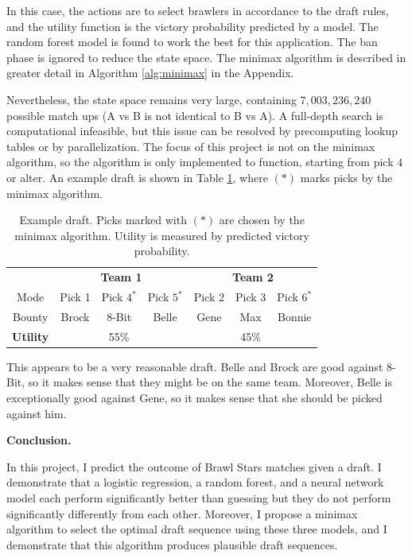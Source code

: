 \documentclass[11pt]{article}
\begin{document}
In this case, the actions are to select brawlers in accordance to the draft rules, and the utility function is the victory probability predicted by a model. The random forest model is found to work the best for this application. The ban phase is ignored to reduce the state space. The minimax algorithm is described in greater detail in Algorithm \ref{alg:minimax} in the Appendix.

Nevertheless, the state space remains very large, containing $7,003,236,240$ possible match ups (A vs B is not identical to B vs A). A full-depth search is computational infeasible, but this issue can be resolved by precomputing lookup tables or by parallelization. The focus of this project is not on the minimax algorithm, so the algorithm is only implemented to function, starting from pick $4$ or alter. An example draft is shown in Table \ref{tab:draft}, where $(*)$ marks picks by the minimax algorithm.

\begin{table}[h!]
\centering
\begin{tabular}{c|ccc|ccc}
    & \multicolumn{3}{c|}{\textbf{Team 1}} & \multicolumn{3}{c}{\textbf{Team 2}} \\ 
    Mode & Pick 1 & Pick $4^{*}$ & Pick $5^{*}$ & Pick 2 & Pick 3 & Pick $6^{*}$ \\
    Bounty & Brock & 8-Bit & Belle & Gene & Max & Bonnie \\
    \hline
    \textbf{Utility} & & 55\% & &  & 45\% & 
\end{tabular}
\caption{Example draft. Picks marked with $(*)$ are chosen by the minimax algorithm. Utility is measured by predicted victory probability.}
\label{tab:draft}
\end{table}

This appears to be a very reasonable draft. Belle and Brock are good against 8-Bit, so it makes sense that they might be on the same team. Moreover, Belle is exceptionally good against Gene, so it makes sense that she should be picked against him.

\textbf{Conclusion.}

In this project, I predict the outcome of Brawl Stars matches given a draft. I demonstrate that a logistic regression, a random forest, and a neural network model each perform significantly better than guessing but they do not perform significantly differently from each other. Moreover, I propose a minimax algorithm to select the optimal draft sequence using these three models, and I demonstrate that this algorithm produces plausible draft sequences.
\end{document}
